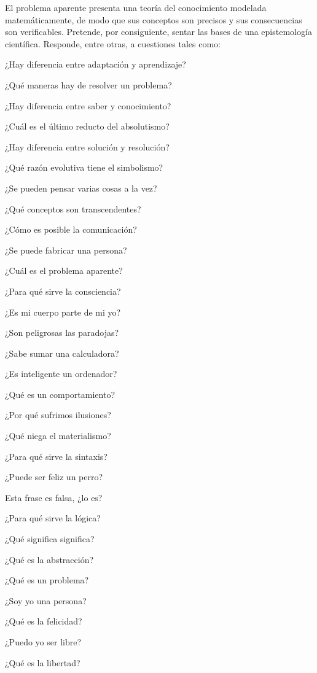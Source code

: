 {\pboldtextfont El problema aparente}
presenta una teoría del conocimiento modelada matemáticamente,
de modo que sus conceptos son precisos y
sus consecuencias son verificables.
Pretende, por consiguiente,
sentar las bases de una epistemología científica.
Responde, entre otras, a cuestiones tales como:
 \par
 ¿Hay diferencia entre adaptación y aprendizaje?\par
 ¿Qué maneras hay de resolver un problema?\par
 ¿Hay diferencia entre saber y conocimiento?\par
 ¿Cuál es el último reducto del absolutismo?\par
 ¿Hay diferencia entre solución y resolución?\par
 ¿Qué razón evolutiva tiene el simbolismo?\par
 ¿Se pueden pensar varias cosas a la vez?\par
 ¿Qué conceptos son transcendentes?\par
 ¿Cómo es posible la comunicación?\par
 ¿Se puede fabricar una persona?\par
 ¿Cuál es el problema aparente?\par
 ¿Para qué sirve la consciencia?\par
 ¿Es mi cuerpo parte de mi yo?\par
 ¿Son peligrosas las paradojas?\par
 ¿Sabe sumar una calculadora?\par
 ¿Es inteligente un ordenador?\par
 ¿Qué es un comportamiento?\par
 ¿Por qué sufrimos ilusiones?\par
 ¿Qué niega el materialismo?\par
 ¿Para qué sirve la sintaxis?\par
 ¿Puede ser feliz un perro?\par
 Esta frase es falsa, ¿lo es?\par
 ¿Para qué sirve la lógica?\par
 ¿Qué significa significa?\par
 ¿Qué es la abstracción?\par
 ¿Qué es un problema?\par
 ¿Soy yo una persona?\par
 ¿Qué es la felicidad?\par
 ¿Puedo yo ser libre?\par
 ¿Qué es la libertad?\par
